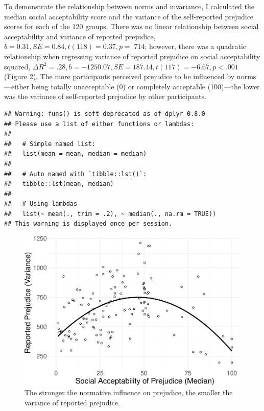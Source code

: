 \documentclass[english,,man]{apa6}
\begin{document}
To demonstrate the relationship between norms and invariance, I calculated the median social acceptability score and the variance of the self-reported prejudice scores for each of the 120 groups. There was no linear relationship between social acceptability and variance of reported prejudice, \(b = 0.31, SE = 0.84, t(118) = 0.37, p = .714\); however, there was a quadratic relationship when regressing variance of reported prejudice on social acceptability squared, \(\Delta R^2 = .28, b = -1250.07, SE = 187.44, t(117) = -6.67, p < .001\) (Figure 2). The more participants perceived prejudice to be influenced by norms---either being totally unacceptable (0) or completely acceptable (100)---the lower was the variance of self-reported prejudice by other participants.

\begin{verbatim}
## Warning: funs() is soft deprecated as of dplyr 0.8.0
## Please use a list of either functions or lambdas: 
## 
##   # Simple named list: 
##   list(mean = mean, median = median)
## 
##   # Auto named with `tibble::lst()`: 
##   tibble::lst(mean, median)
## 
##   # Using lambdas
##   list(~ mean(., trim = .2), ~ median(., na.rm = TRUE))
## This warning is displayed once per session.
\end{verbatim}

\begin{figure}
\centering
\includegraphics{beta_hurdle_files/figure-latex/unnamed-chunk-3-1.pdf}
\caption{\label{fig:unnamed-chunk-3}The stronger the normative influence on prejudice, the smaller the variance of reported prejudice.}
\end{figure}
\end{document}
